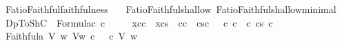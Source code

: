 %
\begin{isabellebody}%
%
%
\isadelimdocument
%
\endisadelimdocument
%
\isatagdocument
%
\isamarkuptrue%
%
\endisatagdocument
{\isafolddocument}%
%
\isadelimdocument
%
\endisadelimdocument
%
\isadelimtheory
%
\endisadelimtheory
%
\isatagtheory
{}\isamarkupfalse%
\ FatioFaithful{\isacharunderscore}{\kern0pt}faithfulness\isanewline
\ \ \ FatioFaithful{\isacharunderscore}{\kern0pt}shallow\ FatioFaithful{\isacharunderscore}{\kern0pt}shallow{\isacharunderscore}{\kern0pt}minimal\isanewline
{}%
\endisatagtheory
{\isafoldtheory}%
%
\isadelimtheory
%
\endisadelimtheory
%
\isadelimdocument
%
\endisadelimdocument
%
\isatagdocument
%
\isamarkuptrue%
%
\endisatagdocument
{\isafolddocument}%
%
\isadelimdocument
%
\endisadelimdocument
{}\isamarkupfalse%
\ DpToShC\ {\isacharcolon}{\kern0pt}{\isacharcolon}{\kern0pt}\ {\isachardoublequoteopen}Formula{\isasymRightarrow}{\isasymsigma}\isactrlsub c{\isachardoublequoteclose}\ {\isacharparenleft}{\kern0pt}{\isachardoublequoteopen}{\isasymlangle}{\isacharunderscore}{\kern0pt}{\isasymrangle}\isactrlsup c{\isachardoublequoteclose}{\isacharparenright}{\kern0pt}\ \isanewline
\ \ \ \ {\isachardoublequoteopen}{\isasymlangle}x\isactrlsup c{\isasymrangle}\isactrlsup c\ {\isacharequal}{\kern0pt}\ x\isactrlsup c\isactrlsup s{\isachardoublequoteclose}\ {\isacharbar}{\kern0pt}\ {\isachardoublequoteopen}{\isasymlangle}{\isasymnot}\isactrlsup c{\isasymphi}{\isasymrangle}\isactrlsup c\ {\isacharequal}{\kern0pt}\ {\isasymnot}\isactrlsup c\isactrlsup s{\isasymlangle}{\isasymphi}{\isasymrangle}\isactrlsup c{\isachardoublequoteclose}\ {\isacharbar}{\kern0pt}\ {\isachardoublequoteopen}{\isasymlangle}{\isasymphi}\ {\isasymsupset}\isactrlsup c\ {\isasympsi}{\isasymrangle}\isactrlsup c\ {\isacharequal}{\kern0pt}\ {\isasymlangle}{\isasymphi}{\isasymrangle}\isactrlsup c\ {\isasymsupset}\isactrlsup c\isactrlsup s\ {\isasymlangle}{\isasympsi}{\isasymrangle}\isactrlsup c{\isachardoublequoteclose}\isanewline
\isanewline
{}\isamarkupfalse%
\ Faithful{}a{\isacharcolon}{\kern0pt}\ {\isachardoublequoteopen}{\isasymforall}V\ w{\isachardot}{\kern0pt}\ V{\isacharcomma}{\kern0pt}w\ {\isasymTurnstile}\isactrlsup c\ {\isasymphi}\ {\isasymlongleftrightarrow}\ {\isasymlangle}{\isasymphi}{\isasymrangle}\isactrlsup c\ V\ w{\isachardoublequoteclose}\isanewline

\end{isabellebody}
